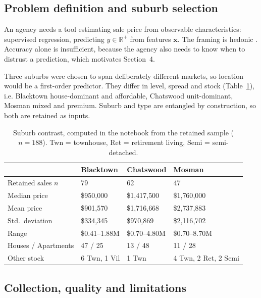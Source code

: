 \subsection{Problem definition and suburb selection}

An agency needs a tool estimating sale price from observable characteristics:
supervised regression, predicting $y \in \mathbb{R}^{+}$ from features $\mathbf{x}$.
The framing is hedonic \cite{rosen1974hedonic,malpezzi2003hedonic}. Accuracy alone is
insufficient, because the agency also needs to know when to distrust a prediction,
which motivates Section~4.

Three suburbs were chosen to span deliberately different markets, so location would be
a first-order predictor. They differ in level, spread and stock (Table~\ref{tab:suburbs}), i.e. Blacktown house-dominant and affordable, Chatswood
unit-dominant, Mosman mixed and premium. Suburb and type are entangled by construction,
so both are retained as inputs.

\begin{table}[H]
\centering\small
\begin{tabularx}{\textwidth}{@{}l XXX@{}}
\toprule
 & \textbf{Blacktown} & \textbf{Chatswood} & \textbf{Mosman} \\
\midrule
Retained sales $n$   & 79 & 62 & 47 \\
Median price         & \$950{,}000 & \$1{,}417{,}500 & \$1{,}760{,}000 \\
Mean price           & \$901{,}570 & \$1{,}716{,}668 & \$2{,}737{,}883 \\
Std.\ deviation      & \$334{,}345 & \$970{,}869 & \$2{,}116{,}702 \\
Range                & \$0.41--1.88M & \$0.70--4.80M & \$0.70--8.70M \\
Houses / Apartments  & 47 / 25 & 13 / 48 & 11 / 28 \\
Other stock          & 6 Twn, 1 Vil & 1 Twn & 4 Twn, 2 Ret, 2 Semi \\
\bottomrule
\end{tabularx}
\caption{Suburb contrast, computed in the notebook from the retained sample
($n=188$). Twn = townhouse, Ret = retirement living, Semi = semi-detached.}
\label{tab:suburbs}
\end{table}

\subsection{Collection, quality and limitations}

